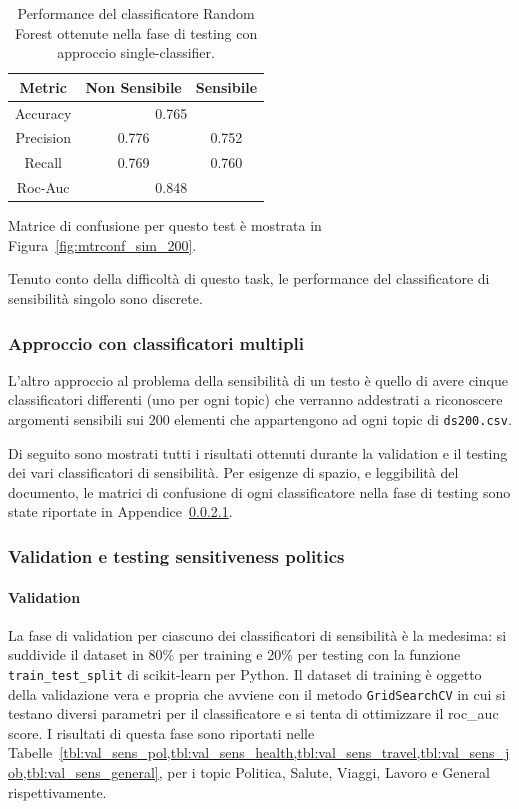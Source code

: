 \begin{table}[h]

\centering
\begin{tabular}{|c|c|c|}
\hline
\textbf{Metric} & \textbf{Non Sensibile} & \textbf{Sensibile} \\ \hline
Accuracy & \multicolumn{2}{c|}{0.765} \\ \hline
Precision & 0.776 & 0.752 \\ \hline
Recall & 0.769 & 0.760 \\ \hline
Roc-Auc & \multicolumn{2}{c|}{0.848} \\ \hline
\end{tabular}
\caption{Performance del classificatore Random Forest ottenute nella fase di testing con approccio single-classifier.}
\label{tbl:training_sens}
\end{table}
\FloatBarrier

Matrice di confusione per questo test è mostrata in Figura~\ref{fig:mtrconf_sim_200}.


Tenuto conto della difficoltà di questo task, le performance del classificatore di sensibilità singolo sono discrete.

\subsubsection{Approccio con classificatori multipli}
\label{sssec:multiclass}
L'altro approccio al problema della sensibilità di un testo è quello di avere cinque classificatori differenti (uno per ogni topic) che verranno addestrati a riconoscere argomenti sensibili sui 200 elementi che appartengono ad ogni topic di {\tt ds200.csv}.

Di seguito sono mostrati tutti i risultati ottenuti durante la validation e il testing dei vari classificatori di sensibilità. Per esigenze di spazio, e leggibilità del documento, le matrici di confusione di ogni classificatore nella fase di testing sono state riportate in Appendice~\ref{}.

\subsubsection{Validation e testing sensitiveness politics}
\label{sssec:val_testing_pol}
\paragraph{Validation} La fase di validation per ciascuno dei classificatori di sensibilità è la medesima: si suddivide il dataset in 80\% per training e 20\% per testing con la funzione {\tt train\_test\_split} di scikit-learn per Python. Il dataset di training è oggetto della validazione vera e propria che avviene con il metodo {\tt GridSearchCV} in cui si testano diversi parametri per il classificatore e si tenta di ottimizzare il roc\_auc score.  I risultati di questa fase sono riportati nelle Tabelle~\cref{tbl:val_sens_pol,tbl:val_sens_health,tbl:val_sens_travel,tbl:val_sens_job,tbl:val_sens_general}, per i topic Politica, Salute, Viaggi, Lavoro e General rispettivamente.

